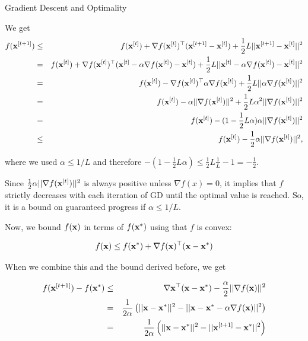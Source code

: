 \documentclass[11pt,compress,t,notes=noshow, xcolor=table]{beamer}
\begin{document}
\begin{vbframe}{Gradient Descent and Optimality}
\begin{footnotesize}
	We get
	\vspace*{-0.3cm}
	\begin{eqnarray*}
	f(\mathbf{x}^{[t+1]}) &\leq& f(\mathbf{x}^{[t]}) + \nabla f(\mathbf{x}^{[t]})^\top(\mathbf{x}^{[t+1]} - \mathbf{x}^{[t]}) + \frac{1}{2}L ||\mathbf{x}^{[t+1]} - \mathbf{x}^{[t]}||^2 \\
	&=& f(\mathbf{x}^{[t]}) + \nabla f(\mathbf{x}^{[t]})^\top(\mathbf{x}^{[t]} - \alpha \nabla f(\mathbf{x}^{[t]}) - \mathbf{x}^{[t]}) + \frac{1}{2}L ||\mathbf{x}^{[t]} - \alpha \nabla f(\mathbf{x}^{[t]}) - \mathbf{x}^{[t]}||^2 \\
	& = & f(\mathbf{x}^{[t]}) - \nabla f(\mathbf{x}^{[t]})^\top \alpha  \nabla f(\mathbf{x}^{[t]}) + \frac{1}{2}L ||\alpha \nabla f(\mathbf{x}^{[t]})||^2 \\
	&=& f(\mathbf{x}^{[t]}) - \alpha ||\nabla f(\mathbf{x}^{[t]})||^2 + \frac{1}{2}L\alpha^2 ||\nabla f(\mathbf{x}^{[t]})||^2 \\
	&=& f(\mathbf{x}^{[t]}) - (1 - \frac{1}{2} L \alpha)\alpha  ||\nabla f(\mathbf{x}^{[t]})||^2 \\
	&\le& f(\mathbf{x}^{[t]}) - \frac{1}{2}\alpha ||\nabla f(\mathbf{x}^{[t]})||^2, 
	\end{eqnarray*}

	where we used $\alpha \leq 1/L$ and therefore $- (1 - \frac{1}{2} L \alpha) \leq \frac{1}{2} L \frac{1}{L} -1 = -\frac{1}{2}$.
				
	Since $\frac{1}{2} \alpha ||\nabla f(\mathbf{x}^{[t]})||^2$ is always positive unless $\nabla f(x) = 0$, it implies that $f$ strictly decreases with each iteration of GD until the optimal value is reached. So, it is a bound on guaranteed progress if $\alpha \leq 1/L$. 
	\end{footnotesize}
	
	\framebreak
	
			Now, we bound $f(\mathbf{x})$ in terms of $f(\mathbf{x}^\ast)$ using that $f$ is convex: 
			
			$$
			f(\mathbf{x}) \leq f(\mathbf{x}^\ast) + \nabla f(\mathbf{x})^\top (\mathbf{x} - \mathbf{x}^\ast)
			$$ 
			
			When we combine this and the bound derived before, we get
			
			\begin{eqnarray*}
				f(\mathbf{x}^{[t+1]}) - f(\mathbf{x}^\ast) &\leq& \nabla \mathbf{x}^\top (\mathbf{x}-\mathbf{x}^*) - \frac{\alpha}{2}||\nabla f(\mathbf{x})||^2 \\
				&=& \frac{1}{2 \alpha} \left( ||\mathbf{x}-\mathbf{x}^\ast||^2 - || \mathbf{x} - \mathbf{x}^\ast - \alpha \nabla f(\mathbf{x})||^2 \right) \\
				&=& \frac{1}{2 \alpha} \left( ||\mathbf{x}-\mathbf{x}^\ast||^2 - || \mathbf{x}^{[t+1]} - \mathbf{x}^\ast ||^2 \right)
			\end{eqnarray*}
		

\end{vbframe}
\end{document}
